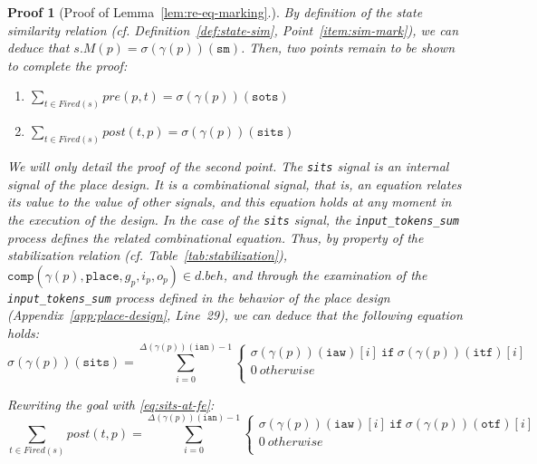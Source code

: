 \documentclass[pdflatex,sn-mathphys]{sn-jnl}%
\theoremstyle{thmstyleone}%
\theoremstyle{thmstyletwo}%
\newtheorem*{pf}{Proof}%
\theoremstyle{thmstylethree}%
\begin{document}
\begin{pf}[Proof of Lemma~\ref{lem:re-eq-marking}.]
  \bigskip
  
  By definition of the state similarity relation
  (cf. Definition~\ref{def:state-sim}, Point~\ref{item:sim-mark}), we
  can deduce that $s.M(p)=\sigma(\gamma(p))(\texttt{sm})$. Then, two
  points remain to be shown to complete the proof:
  \begin{enumerate}
  \item $\sum\limits_{t\in{}Fired(s)}pre(p,t)=\sigma(\gamma(p))(\texttt{sots})$
  \item $\sum\limits_{t\in{}Fired(s)}post(t,p)=\sigma(\gamma(p))(\texttt{sits})$
  \end{enumerate}

  \bigskip
  
  We will only detail the proof of the second point. The \texttt{sits}
  signal is an internal signal of the place design. It is a
  \textit{combinational} signal, that is, an equation relates its
  value to the value of other signals, and this equation holds at any
  moment in the execution of the design.  In the case of the
  \texttt{sits} signal, the \texttt{input\_tokens\_sum} process
  defines the related combinational equation.  Thus, by property of
  the stabilization relation (cf. Table~\ref{tab:stabilization}),
  $\mathtt{comp}(\gamma(p),\mathtt{place},g_p,i_p,o_p)\in{}d.beh$, and
  through the examination of the \texttt{input\_tokens\_sum} process
  defined in the behavior of the place design
  (Appendix~\ref{app:place-design}, Line~29), we can deduce that the
  following equation holds:
  \begin{equation}
    \label{eq:sits-at-fe}
    \sigma(\gamma(p))(\texttt{sits})=\sum\limits_{i=0}^{\Delta(\gamma(p))(\texttt{ian})-1}
    \begin{cases}
      \sigma(\gamma(p))(\texttt{iaw})[i]~\mathtt{if}~\sigma(\gamma(p))(\texttt{itf})[i]\\
      0~otherwise \\
    \end{cases}
  \end{equation}

  \noindent{}Rewriting the goal with \eqref{eq:sits-at-fe}:\\
  \begin{equation*}
    \boxed{
      \sum\limits_{t\in{}Fired(s)}post(t,p)=\sum\limits_{i=0}^{\Delta(\gamma(p))(\texttt{ian})-1}
      \begin{cases}
        \sigma(\gamma(p))(\texttt{iaw})[i]~\mathtt{if}~\sigma(\gamma(p))(\texttt{otf})[i]\\
        0~otherwise \\
      \end{cases}}
  \end{equation*}


\end{pf}
\end{document}
